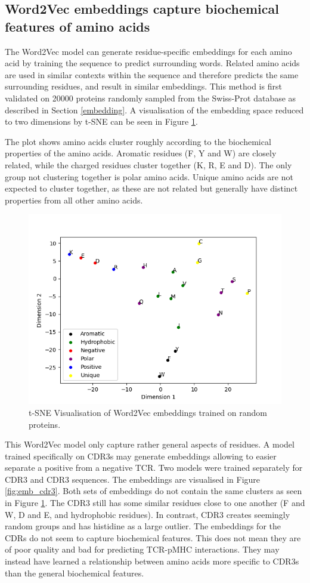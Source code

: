 \subsection{Word2Vec embeddings capture biochemical features of amino acids}
The Word2Vec model can generate residue-specific embeddings for each amino acid by training the sequence to predict surrounding words. Related amino acids are used in similar contexts within the sequence and therefore predicts the same surrounding residues, and result in similar embeddings. This method is first validated on 20000 proteins randomly sampled from the Swiss-Prot database as described in Section \ref{embedding}. A visualisation of the embedding space reduced to two dimensions by t-SNE can be seen in Figure \ref{fig:emb_prot}.

The plot shows amino acids cluster roughly according to the biochemical properties of the amino acids. Aromatic residues (F, Y and W) are closely related, while the charged residues cluster together (K, R, E and D). The only group not clustering together is polar amino acids. Unique amino acids are not expected to cluster together, as these are not related but generally have distinct properties from all other amino acids.
\begin{figure}
    \centering
    \includegraphics[width=0.65\linewidth]{figures/embedding_proteins.png}
    \caption{t-SNE Visualisation of Word2Vec embeddings trained on random proteins.}
    \label{fig:emb_prot}
\end{figure}

This Word2Vec model only capture rather general aspects of residues. A model trained specifically on CDR3s may generate embeddings allowing to easier separate a positive from a negative TCR. Two models were trained separately for CDR3{\textalpha} and CDR3{\textbeta} sequences. The embeddings are visualised in Figure \ref{fig:emb_cdr3}. Both sets of embeddings do not contain the same clusters as seen in Figure \ref{fig:emb_prot}. The CDR3{\textalpha} still has some similar residues close to one another (F and W, D and E, and hydrophobic residues). In contrast, CDR3{\textbeta} creates seemingly random groups and has histidine as a large outlier.
The embeddings for the CDRs do not seem to capture biochemical features. This does not mean they are of poor quality and bad for predicting TCR-pMHC interactions. They may instead have learned a relationship between amino acids more specific to CDR3s than the general biochemical features.

